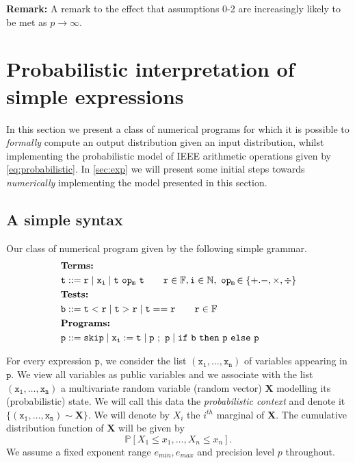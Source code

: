 \documentclass[10pt,conference]{IEEEtran}
\newcommand{\Pro}[1]{\mathbb{P}\left[ #1 \right]}
\newcommand{\F}{\mathbb{F}}
\newcommand{\N}{\mathbb{N}}
\newcommand{\mop}{~\mathtt{op_m}~}
\begin{document}
\textbf{Remark:}
A remark to the effect that assumptions 0-2 are increasingly likely to be met as $p\to\infty$.


\section{Probabilistic interpretation of simple expressions}
In this section we present a class of numerical programs for which it is possible to \emph{formally} compute an output distribution given an input distribution, whilst implementing the probabilistic model of IEEE arithmetic operations given by \cref{eq:probabilistic}. In \cref{sec:exp} we will present some initial steps towards \emph{numerically} implementing the model presented in this section.

\subsection{A simple syntax}\label{subsec:syntax}

Our class of numerical program given by the following simple grammar.
\begin{align*}
&\textbf{Terms: }  
\\
& \tt t::= r \mid x_i \mid t\mop t \qquad \mathtt{r}\in\F, \mathtt{i}\in\N, \mop\hspace{-1ex}\in\{+.-,\times,\div\}
\\
&\textbf{Tests: } 
\\
& \tt b::= t < r \mid t > r \mid t == r  \qquad \mathtt{r}\in\F
\\
&\textbf{Programs:}
\\ 
&\tt p::= skip \mid \mathtt{x_i:=t}\mid \mathtt{p~;~p} \mid if~b~then~p~else~p
\end{align*}

For every expression $\mathtt{p}$, we consider the list $(\mathtt{x_1,\ldots,x_n})$ of variables appearing in $\mathtt{p}$. We view all variables as public variables and we associate with the list $(\mathtt{x_1,\ldots,x_n})$ a multivariate random variable (random vector) $\mathbf{X}$ modelling its (probabilistic) state. We will call this data the \emph{probabilistic context} and denote it $\{(\mathtt{x_1},\ldots,\mathtt{x_n})\sim\mathbf{X}\}$. We will denote by $X_i$ the $i^{th}$ marginal of $\mathbf{X}$. The cumulative distribution function of $\mathbf{X}$ will be given by
\[
\Pro{X_1\leq x_1,\ldots, X_n\leq x_n}.
\] 
We assume a fixed exponent range $e_{min}, e_{max}$ and precision level $p$ throughout.
\end{document}
